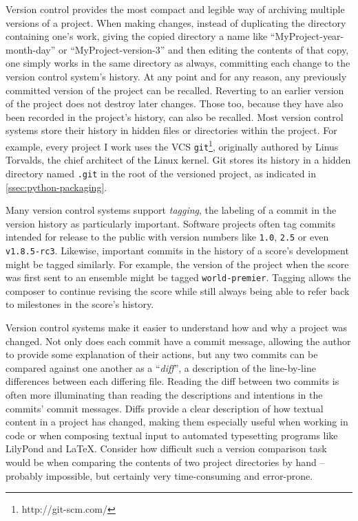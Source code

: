 Version control provides the most compact and legible way of archiving multiple
versions of a project. When making changes, instead of duplicating the
directory containing one's work, giving the copied directory a name like
\enquote{MyProject-year-month-day} or \enquote{MyProject-version-3} and then
editing the contents of that copy, one simply works in the same directory as
always, committing each change to the version control system's history. At any
point and for any reason, any previously committed version of the project can
be recalled. Reverting to an earlier version of the project does not destroy
later changes. Those too, because they have also been recorded in the project's
history, can also be recalled. Most version control systems store their history
in hidden files or directories within the project. For example, every project I
work uses the VCS \texttt{git}\footnote{http://git-scm.com/}, originally
authored by Linus Torvalds, the chief architect of the Linux kernel. Git stores
its history in a hidden directory named \texttt{.git} in the root of the
versioned project, as indicated in \autoref{ssec:python-packaging}.

Many version control systems support \emph{tagging}, the labeling of a commit
in the version history as particularly important. Software projects often tag
commits intended for release to the public with version numbers like
\texttt{1.0}, \texttt{2.5} or even \texttt{v1.8.5-rc3}. Likewise, important
commits in the history of a score's development might be tagged similarly. For
example, the version of the project when the score was first sent to an
ensemble might be tagged \texttt{world-premier}. Tagging allows the composer to
continue revising the score while still always being able to refer back to
milestones in the score's history.

Version control systems make it easier to understand how and why a project was
changed. Not only does each commit have a commit message, allowing the author
to provide some explanation of their actions, but any two commits can be
compared against one another as a \enquote{\emph{diff}}, a description of the
line-by-line differences between each differing file. Reading the diff between
two commits is often more illuminating than reading the descriptions and
intentions in the commits' commit messages. Diffs provide a clear
description of how textual content in a project has changed, making them
especially useful when working in code or when composing textual input to
automated typesetting programs like LilyPond and LaTeX. Consider how difficult
such a version comparison task would be when comparing the contents of two
project directories by hand -- probably impossible, but certainly very
time-consuming and error-prone.


